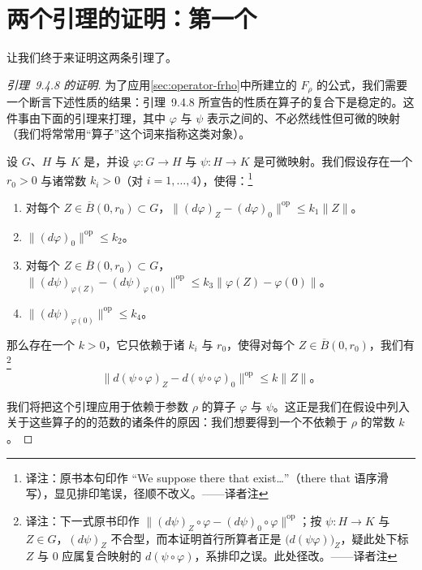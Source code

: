 
\section{两个引理的证明：第一个}
\label{sec:proof-first}

让我们终于来证明这两条引理了。

\begin{proof}[引理~9.4.8 的证明]
为了应用\cref{sec:operator-frho}中所建立的 $F_{\rho}$ 的公式，我们需要一个断言下述性质的结果：引理~9.4.8 所宣告的性质在算子的复合下是稳定的。这件事由下面的引理来打理，其中 $\varphi$ 与 $\psi$ 表示\trBanachSpace{}之间的、不必然线性但可微的映射（我们将常常用“算子”这个词来指称这类对象）。

\begin{lemma}\label{thm:dpsi-dphi-compose}
设 $G$、$H$ 与 $K$ 是\trBanachSpace{}，并设 $\varphi\colon G\to H$ 与 $\psi\colon H\to K$ 是可微映射。我们假设存在一个 $r_{0}>0$ 与诸常数 $k_{i}>0$（对 $i=1,\dots,4$），使得：\footnote{译注：原书本句印作 “We suppose there that exist…”（there that 语序滑写），显见排印笔误，径顺不改义。——译者注}
\begin{enumerate}[label=(\arabic*)]
\item 对每个 $Z\in\overline{B}(0,r_{0})\subset G$，$\bigl\|(d\varphi)_{Z}-(d\varphi)_{0}\bigr\|^{\mathrm{op}}\le k_{1}\|Z\|$。
\item $\bigl\|(d\varphi)_{0}\bigr\|^{\mathrm{op}}\le k_{2}$。
\item 对每个 $Z\in\overline{B}(0,r_{0})\subset G$，$\bigl\|(d\psi)_{\varphi(Z)}-(d\psi)_{\varphi(0)}\bigr\|^{\mathrm{op}}\le k_{3}\|\varphi(Z)-\varphi(0)\|$。
\item $\bigl\|(d\psi)_{\varphi(0)}\bigr\|^{\mathrm{op}}\le k_{4}$。
\end{enumerate}
那么存在一个 $k>0$，它只依赖于诸 $k_{i}$ 与 $r_{0}$，使得对每个 $Z\in\overline{B}(0,r_{0})$，我们有\footnote{译注：下一式原书印作 $\bigl\|(d\psi)_{Z}\circ\varphi-(d\psi)_{0}\circ\varphi\bigr\|^{\mathrm{op}}$；按 $\psi\colon H\to K$ 与 $Z\in G$，$(d\psi)_{Z}$ 不合型，而本证明首行所算者正是 $\bigl(d(\psi\varphi)\bigr)_{Z}$，疑此处下标 $Z$ 与 $0$ 应属复合映射的\trDifferential{} $d(\psi\circ\varphi)$，系排印之误。此处径改。——译者注}
\[
\bigl\|d(\psi\circ\varphi)_{Z}-d(\psi\circ\varphi)_{0}\bigr\|^{\mathrm{op}}\le k\|Z\|\text{。}
\]
\end{lemma}

我们将把这个引理应用于依赖于参数 $\rho$ 的算子 $\varphi$ 与 $\psi$。这正是我们在假设中列入关于这些算子的\trDifferential{}的范数的诸条件的原因：我们想要得到一个不依赖于 $\rho$ 的常数 $k$。


\end{proof}
